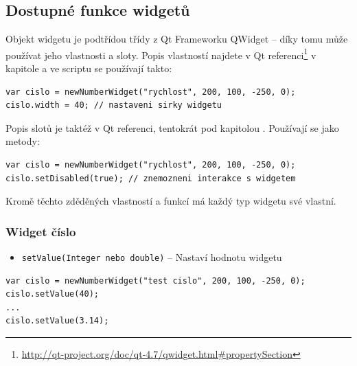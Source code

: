 \documentclass[12pt, a4paper, oneside]{article}
\newcommand{\It}{\textit}  %
\begin{document}
\subsection*{Dostupné funkce widgetů}
Objekt widgetu je podtřídou třídy z Qt Frameworku QWidget -- díky tomu může používat jeho vlastnosti a sloty. Popis vlastností najdete v Qt referenci\footnote{\url{http://qt-project.org/doc/qt-4.7/qwidget.html\#propertySection}} v kapitole  a ve scriptu se používají takto:

\noindent\begin{minipage}{\textwidth}
\begin{lstlisting}[caption=Vytvoření widgetu \It{číslo} a nastaveni vlastnosti \uv{width}]
var cislo = newNumberWidget("rychlost", 200, 100, -250, 0);
cislo.width = 40; // nastaveni sirky widgetu
\end{lstlisting}
\end{minipage}

Popis slotů je taktéž v Qt referenci, tentokrát pod kapitolou . Používají se jako metody:

\noindent\begin{minipage}{\textwidth}
\begin{lstlisting}[caption=Vytvoření widgetu \It{číslo} a použití slotu]
var cislo = newNumberWidget("rychlost", 200, 100, -250, 0);
cislo.setDisabled(true); // znemozneni interakce s widgetem
\end{lstlisting}
\end{minipage}

Kromě těchto zděděných vlastností a funkcí má každý typ widgetu své vlastní.

\subsubsection*{Widget číslo}
\begin{itemize}
    \item {\color{blue}\verb/setValue(Integer nebo double)/} -- Nastaví hodnotu widgetu
\end{itemize}

\noindent\begin{minipage}{\textwidth}
\begin{lstlisting}[caption=Nastavení hodnoty widgetu \It{číslo}]
var cislo = newNumberWidget("test cislo", 200, 100, -250, 0);
cislo.setValue(40);
...
cislo.setValue(3.14);
\end{lstlisting}
\end{minipage}
\end{document}
